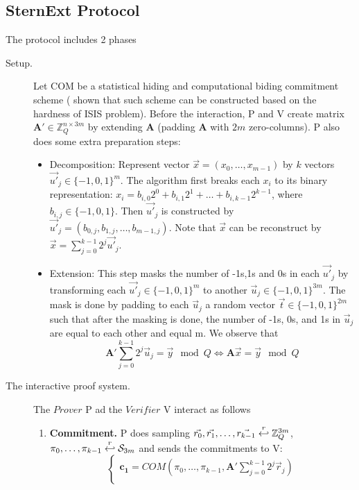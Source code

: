 \subsection{SternExt Protocol}
\label{append:Stern}
The protocol includes 2 phases
\begin{description}
\item[Setup.] Let COM be a statistical hiding and computational biding commitment scheme (\cite{kawachi2008concurrently}
  shown that such scheme can be constructed based on the hardness of ISIS problem).  Before the interaction, P and V
  create matrix $\mathbf{A'} \in \mathbb{Z}_Q^{n\times 3m}$ by extending $\mathbf{A}$ (padding $\mathbf{A}$ with $2m$
  zero-columns). P also does some extra preparation steps:
  \begin{itemize}
  \item Decomposition: Represent vector $\vec{x} = (x_0, \dots, x_{m-1})$ by $k$ vectors
    ${\vec{u'}}_j \in \{-1,0,1\}^m$. The algorithm first breaks each $x_i$ to its binary representation:
    $x_i = b_{i,0}2^0 + b_{i,1}2^1 + \dots + b_{i,k-1}2^{k-1}$, where $b_{i,j} \in \{-1, 0, 1\}$. Then ${\vec{u'}}_j$ is
    constructed by ${\vec{u'}}_j = (b_{0,j}, b_{1,j}, \dots, b_{m-1,j})$. Note that $\vec{x}$ can be reconstruct by
    $\vec{x} = \sum_{j = 0}^{k - 1}2^j{\vec{u'}}_j$.
  \item Extension: This step masks the number of -1s,1s and 0s in each ${\vec{u'}}_j$ by transforming each
    ${\vec{u'}}_j \in \{-1,0,1\}^m$ to another $\vec{u}_j \in \{-1,0,1\}^{3m}$. The mask is done by padding to each
    ${\vec{u}}_j$ a random vector $\vec{t} \in \{-1,0,1\}^{2m}$ such that after the masking is done, the number of -1s,
    0s, and 1s in $\vec{u}_j$ are equal to each other and equal m. We observe that
    \[
      \mathbf{A'}\sum_{j=0}^{k-1}2^j\vec{u}_j = \vec{y} \mod Q \iff \mathbf{A}\vec{x} = \vec{y} \mod Q
    \]
  \end{itemize}
\item[The interactive proof system.]  The $Prover$ P ad the $Verifier$ V interact as follows
  \begin{enumerate}
  \item \textbf{Commitment.} P does sampling
    $\vec{r_0}, \vec{r_1}, \dots, \vec{r_{k-1}} \stackrel{r}{\hookleftarrow} \mathbb{Z}_Q^{3m}$,
    $\pi_{0}, \dots, \pi_{k-1} \stackrel{r}{\hookleftarrow} \mathcal{S}_{3m}$ and sends the commitments to V:
    \[
      \begin{cases}
        \mathbf{c_1} = COM(\pi_0,\dots,\pi_{k-1},
        \mathbf{A'}\sum_{j=0}^{k-1}2^j\vec{r}_j) \\

\end{cases}\]
\end{enumerate}
\end{description}
